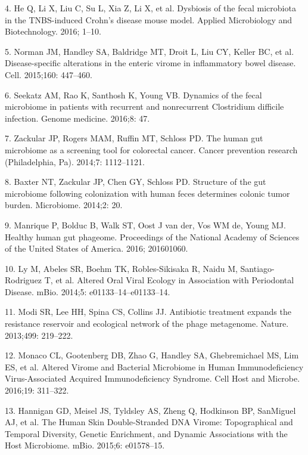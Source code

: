 \documentclass[12pt,]{article}
\begin{document}
\hypertarget{ref-He:2016ch}{}
4. He Q, Li X, Liu C, Su L, Xia Z, Li X, et al. Dysbiosis of the fecal
microbiota in the TNBS-induced Crohn's disease mouse model. Applied
Microbiology and Biotechnology. 2016; 1--10.

\hypertarget{ref-Norman:2015kb}{}
5. Norman JM, Handley SA, Baldridge MT, Droit L, Liu CY, Keller BC, et
al. Disease-specific alterations in the enteric virome in inflammatory
bowel disease. Cell. 2015;160: 447--460.

\hypertarget{ref-Seekatz:2016fz}{}
6. Seekatz AM, Rao K, Santhosh K, Young VB. Dynamics of the fecal
microbiome in patients with recurrent and nonrecurrent Clostridium
difficile infection. Genome medicine. 2016;8: 47.

\hypertarget{ref-Zackular:2014fba}{}
7. Zackular JP, Rogers MAM, Ruffin MT, Schloss PD. The human gut
microbiome as a screening tool for colorectal cancer. Cancer prevention
research (Philadelphia, Pa). 2014;7: 1112--1121.

\hypertarget{ref-Baxter:2014hb}{}
8. Baxter NT, Zackular JP, Chen GY, Schloss PD. Structure of the gut
microbiome following colonization with human feces determines colonic
tumor burden. Microbiome. 2014;2: 20.

\hypertarget{ref-Manrique:2016dx}{}
9. Manrique P, Bolduc B, Walk ST, Oost J van der, Vos WM de, Young MJ.
Healthy human gut phageome. Proceedings of the National Academy of
Sciences of the United States of America. 2016; 201601060.

\hypertarget{ref-Ly:2014ew}{}
10. Ly M, Abeles SR, Boehm TK, Robles-Sikisaka R, Naidu M,
Santiago-Rodriguez T, et al. Altered Oral Viral Ecology in Association
with Periodontal Disease. mBio. 2014;5: e01133--14--e01133--14.

\hypertarget{ref-Modi:2013fia}{}
11. Modi SR, Lee HH, Spina CS, Collins JJ. Antibiotic treatment expands
the resistance reservoir and ecological network of the phage metagenome.
Nature. 2013;499: 219--222.

\hypertarget{ref-Monaco:2016ita}{}
12. Monaco CL, Gootenberg DB, Zhao G, Handley SA, Ghebremichael MS, Lim
ES, et al. Altered Virome and Bacterial Microbiome in Human
Immunodeficiency Virus-Associated Acquired Immunodeficiency Syndrome.
Cell Host and Microbe. 2016;19: 311--322.

\hypertarget{ref-Hannigan:2015fz}{}
13. Hannigan GD, Meisel JS, Tyldsley AS, Zheng Q, Hodkinson BP,
SanMiguel AJ, et al. The Human Skin Double-Stranded DNA Virome:
Topographical and Temporal Diversity, Genetic Enrichment, and Dynamic
Associations with the Host Microbiome. mBio. 2015;6: e01578--15.
\end{document}
